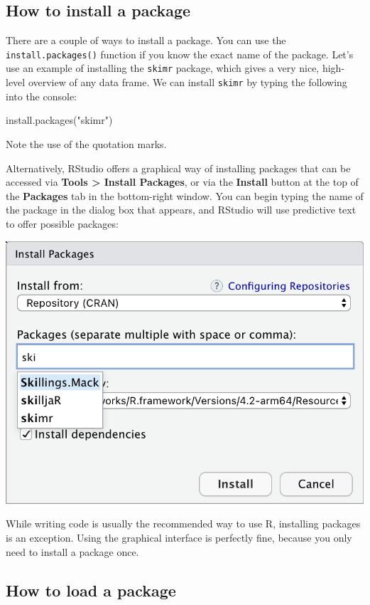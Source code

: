 \documentclass[
]{memoir}
\newenvironment{Shaded}{\begin{snugshade}}{\end{snugshade}}
\newcommand{\FunctionTok}[1]{\textcolor[rgb]{0.00,0.00,0.00}{#1}}
\newcommand{\NormalTok}[1]{#1}
\newcommand{\StringTok}[1]{\textcolor[rgb]{0.31,0.60,0.02}{#1}}
\begin{document}
\hypertarget{how-to-install-a-package}{%
\subsection{How to install a package}\label{how-to-install-a-package}}

There are a couple of ways to install a package. You can use the \texttt{install.packages()} function if you know the exact name of the package. Let's use an example of installing the \texttt{skimr} package, which gives a very nice, high-level overview of any data frame. We can install \texttt{skimr} by typing the following into the console:

\begin{Shaded}
\begin{Highlighting}[]
\FunctionTok{install.packages}\NormalTok{(}\StringTok{"skimr"}\NormalTok{)}
\end{Highlighting}
\end{Shaded}

Note the use of the quotation marks.

Alternatively, RStudio offers a graphical way of installing packages that can be accessed via \textbf{Tools \textgreater{} Install Packages}, or via the \textbf{Install} button at the top of the \textbf{Packages} tab in the bottom-right window. You can begin typing the name of the package in the dialog box that appears, and RStudio will use predictive text to offer possible packages:

\includegraphics[width=0.6\linewidth]{img/install-packages}

While writing code is usually the recommended way to use R, installing packages is an exception. Using the graphical interface is perfectly fine, because you only need to install a package once.

\hypertarget{how-to-load-a-package}{%
\subsection{How to load a package}\label{how-to-load-a-package}}
\end{document}
